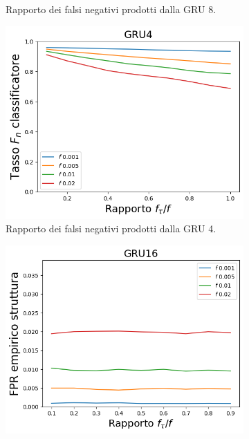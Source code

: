 \documentclass[../../main.tex]{subfiles}
\begin{document}
\begin{figure}[H]
\begin{subfigure}[b]{0.32\textwidth}
            \caption{Rapporto dei falsi negativi prodotti dalla GRU 8.}
            \label{fig:LBFFNR_GRU8}
        \end{subfigure}
        \begin{subfigure}[b]{0.32\textwidth}
            \centering
            \includegraphics[width = \textwidth]{immagini/7/LBF/GRU4_FNR.png}
            \caption{Rapporto dei falsi negativi prodotti dalla GRU 4.}
            \label{fig:LBFFNR_GRU4}
        \end{subfigure}
        \begin{subfigure}[b]{0.32\textwidth}
            \centering
            \includegraphics[width = \textwidth]{immagini/7/LBF/GRU16_FPR.png}

\end{subfigure}
\end{figure}
\end{document}
